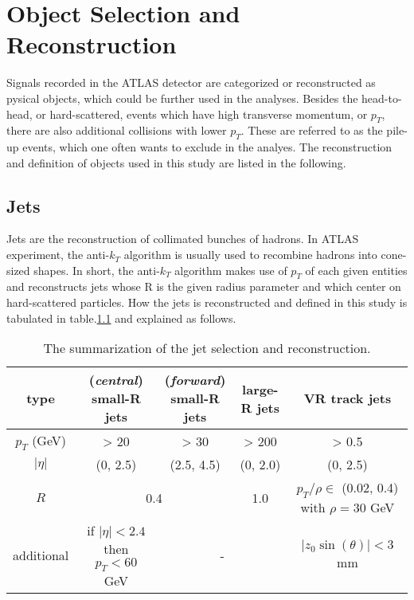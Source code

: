 \documentclass[class=NCU_thesis, crop=false]{standalone}
\begin{document}
\chapter{Object Selection and Reconstruction}
	Signals recorded in the ATLAS detector are categorized or reconstructed as pysical objects, which could be further used in the analyses. Besides the head-to-head, or hard-scattered, events which have high transverse momentum, or $p_T$, there are also additional collisions with lower $p_T$. These are referred to as the pile-up events, which one often wants to exclude in the analyes. The reconstruction and definition of objects used in this study are listed in the following.
	
\section{Jets}
	Jets are the reconstruction of collimated bunches of hadrons. In ATLAS experiment, the anti-$k_T$ algorithm is usually used to recombine hadrons into cone-sized shapes. In short, the anti-$k_T$ algorithm makes use of $p_T$ of each given entities and reconstructs jets whose R is the given radius parameter and which center on hard-scattered particles. How the jets is reconstructed and defined in this study is tabulated in table.\ref{tab:jet selection} and explained as follows.
	
	\begin{table}[h]
		\centering
		\caption{The summarization of the jet selection and reconstruction.}
		\label{tab:jet selection}
		\begin{tabular}{|c|c|c|c|c|}
			\hline
			type & \shortstack{(\textit{central})\\small-R jets} & \shortstack{(\textit{forward})\\small-R jets} & large-R jets & VR track jets \\ \hline
			$p_T$ (GeV) & > 20 & > 30 & > 200 & > 0.5 \\ \hline
			$\lvert \eta \rvert$ & (0, 2.5) & (2.5, 4.5) & (0, 2.0) & (0, 2.5) \\ \hline
			$R$ & \multicolumn{2}{c|}{0.4} & 1.0 & \shortstack{$p_T / \rho \in$ (0.02, 0.4)\\ with $\rho = 30$ GeV} \\ \hline
			additional & \shortstack{if $\lvert \eta \rvert < 2.4$ then\\$p_T < 60$ GeV} & \multicolumn{2}{c|}{-} & $\lvert z_0 \sin(\theta) \rvert < 3$ mm \\ \hline
		\end{tabular}
	\end{table}
	
\end{document}
